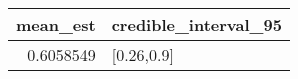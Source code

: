 \begin{longtable}{rl}
\toprule
mean\_est & credible\_interval\_95 \\ 
\midrule
0.6058549 & [0.26,0.9] \\ 
\bottomrule
\end{longtable}

